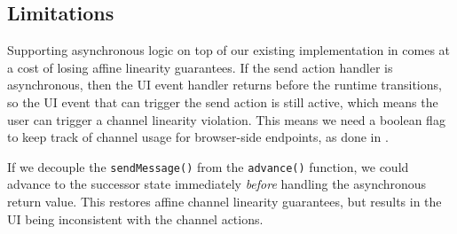 \subsection{Limitations}

Supporting asynchronous logic on top of our
existing implementation in  comes at a cost
of losing affine linearity guarantees.
If the send action handler is asynchronous, then the UI event handler
returns before the runtime transitions, so the UI event that can trigger
the send action is still active, which means the user can trigger
a channel linearity violation. This means we need a boolean flag
to keep track of channel usage for browser-side endpoints, 
as done in \cite{Hybrid2016}.

If we decouple the \texttt{sendMessage()} 
from the \texttt{advance()} function, we could advance to the successor state
immediately \textit{before} handling the asynchronous return value.
This restores affine channel linearity guarantees, but 
results in the UI being inconsistent with the channel
actions.